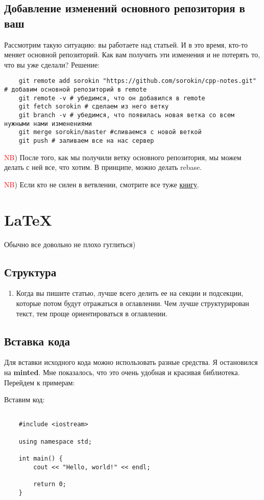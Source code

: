 \documentclass[12pt]{article}
\begin{document}
	\subsection{Добавление изменений основного репозитория в ваш}
	Рассмотрим такую ситуацию: вы работаете над статьей. И в это время, кто-то меняет основной репозиторий. Как вам получить эти изменения и не потерять то, что вы уже сделали?
	Решение:
	\begin{verbatim}
	git remote add sorokin "https://github.com/sorokin/cpp-notes.git" # добавим основной репозиторий в remote
	git remote -v # убедимся, что он добавился в remote
	git fetch sorokin # сделаем из него ветку
	git branch -v # убедимся, что появилась новая ветка со всем нужными нами изменениями
	git merge sorokin/master #сливаемся с новой веткой
	git push # заливаем все на нас сервер
	\end{verbatim}


\textcolor{red}{NB}) После того, как мы получили ветку основного репозитория, мы можем делать с ней все, что хотим. В принципе, можно делать rebase.


\textcolor{red}{NB}) Если кто не силен в ветвлении, смотрите все туже \href{https://git-scm.com/book/ru/v1}{книгу}.
\section{LaTeX}
	Обычно все довольно не плохо гуглиться)
\subsection{Структура}

\begin{enumerate}
    \item Когда вы пишите статью, лучше всего делить ее на секции и подсекции, которые потом будут отражаться в оглавлении. Чем лучше структурирован текст, тем проще ориентироваться в оглавлении.
\end{enumerate}

\subsection{Вставка кода}

Для вставки исходного кода можно использовать разные средства. Я остановился на \textbf{minted}. Мне показалось, что это очень удобная и красивая библиотека. Перейдем к примерам:


Вставим код:
\begin{verbatim}

    #include <iostream>

    using namespace std;

    int main() {
        cout << "Hello, world!" << endl;

        return 0;
    }
\end{verbatim}
\end{document}
